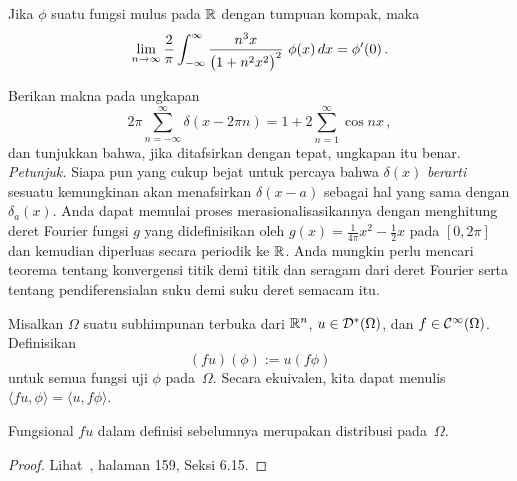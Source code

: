 \begin{prop} Jika $\phi$ suatu fungsi mulus pada $\mathbb{R}$ dengan tumpuan kompak, maka
    \[ \lim_{n \rightarrow \infty}\frac2\pi \int_{-\infty}^\infty \frac{n^3x}{\bigl(1 + n^2x^2\bigr)^2}\,\, \phi(x)\,dx = \phi'(0)\,.\]
\end{prop}

\begin{exer} Berikan makna pada ungkapan
   \[ 2\pi\sum_{n = -\infty}^\infty \delta(x-2\pi n) =  1 +  2\sum_{n = 1}^\infty \cos nx\,, \]
dan tunjukkan bahwa, jika ditafsirkan dengan tepat, ungkapan itu benar. \emph{Petunjuk.} Siapa pun yang cukup bejat untuk percaya bahwa $\delta(x)$ \emph{berarti}
sesuatu kemungkinan akan menafsirkan $\delta(x-a)$ sebagai hal yang sama dengan $\delta_a(x)$. Anda dapat memulai proses
merasionalisasikannya dengan menghitung deret Fourier fungsi $g$ yang didefinisikan oleh $g(x) = \frac1{4\pi}x^2 - \frac12 x$ pada $[0,2\pi]$
dan kemudian diperluas secara periodik ke $\mathbb{R}$. Anda mungkin perlu mencari teorema tentang konvergensi titik demi titik dan seragam dari deret Fourier
serta tentang pendiferensialan suku demi suku deret semacam itu.
\end{exer}

\begin{defn} Misalkan $\Omega$ suatu subhimpunan terbuka dari $\mathbb{R}^n$, $u \in \mathcal{D}^*(\Omega)$, dan $f \in \mathcal{C}^\infty(\Omega)$.
Definisikan
   \[ (fu)(\phi) := u(f\phi) \]
untuk semua fungsi uji $\phi$ pada~$\Omega$. Secara ekuivalen, kita dapat menulis $\langle fu,\phi \rangle = \langle u,f\phi \rangle$.
\end{defn}

\begin{prop} Fungsional $fu$ dalam definisi sebelumnya merupakan distribusi pada~$\Omega$.
\end{prop}

\begin{proof} Lihat~\cite{Rudin:1991}, halaman 159, Seksi 6.15.    \ns
\end{proof}






















